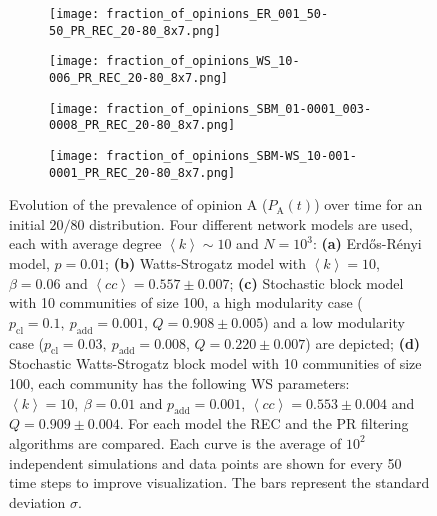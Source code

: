 \documentclass[11 pt , letterpaper , twoside , openright]{book}
\begin{document}
\begin{figure}[H]
  \begin{subfigure}[t]{0.49\textwidth}
  	\texttt{[image: fraction\_of\_opinions\_ER\_001\_50-50\_PR\_REC\_20-80\_8x7.png]}
      \end{subfigure}
  \begin{subfigure}[t]{0.49\textwidth}
  	\texttt{[image: fraction\_of\_opinions\_WS\_10-006\_PR\_REC\_20-80\_8x7.png]}
    \label{ws_20-80_op}
  \end{subfigure}
  \begin{subfigure}[t]{0.49\textwidth}    
    \texttt{[image: fraction\_of\_opinions\_SBM\_01-0001\_003-0008\_PR\_REC\_20-80\_8x7.png]}
  \end{subfigure}
  \begin{subfigure}[t]{0.49\textwidth}
    \texttt{[image: fraction\_of\_opinions\_SBM-WS\_10-001-0001\_PR\_REC\_20-80\_8x7.png]}
    \label{sbm-ws_20-80_op}
  \end{subfigure}
  \captionsetup{format=plain}
  \caption[Evolution of the prevalence of opinion A ($P_\text{A}(t)$) over time for an initial $20/80$ opinion distribution.]{Evolution of the prevalence of opinion A ($P_\text{A}(t)$) over time for an initial $20/80$ distribution. Four different network models are used, each with average degree $\left<k\right> \sim 10$ and $N = 10^3$: \textbf{(a)} Erd\H{o}s-R\'{e}nyi model, $p=0.01$; \textbf{(b)} Watts-Strogatz model with $\left<k\right> = 10$, $\beta = 0.06$ and $\left<cc\right> = 0.557 \pm 0.007$; \textbf{(c)} Stochastic block model with 10 communities of size 100, a high modularity case ($p_{\text{cl}} = 0.1,\ p_{\text{add}} = 0.001$, $Q = 0.908 \pm 0.005$) and a low modularity case ($p_{\text{cl}} = 0.03,\ p_{\text{add}} = 0.008$, $Q = 0.220 \pm 0.007$) are depicted; \textbf{(d)} Stochastic Watts-Strogatz block model with 10 communities of size 100, each community has the following WS parameters: $\left<k\right> = 10,\ \beta = 0.01$ and $p_{\text{add}} = 0.001$, $\left<cc\right> = 0.553 \pm 0.004$ and $Q = 0.909 \pm 0.004$. For each model the REC and the PR filtering algorithms are compared. Each curve is the average of $10^2$ independent simulations and data points are shown for every 50 time steps to improve visualization. The bars represent the standard deviation $\sigma$.}
\label{ev_op_20_80}
\end{figure}
\end{document}
